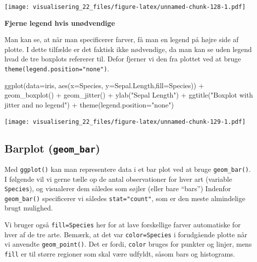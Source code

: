 \documentclass[
]{book}
\newenvironment{Shaded}{\begin{snugshade}}{\end{snugshade}}
\newcommand{\AttributeTok}[1]{\textcolor[rgb]{0.77,0.63,0.00}{#1}}
\newcommand{\FunctionTok}[1]{\textcolor[rgb]{0.00,0.00,0.00}{#1}}
\newcommand{\NormalTok}[1]{#1}
\newcommand{\SpecialCharTok}[1]{\textcolor[rgb]{0.00,0.00,0.00}{#1}}
\newcommand{\StringTok}[1]{\textcolor[rgb]{0.31,0.60,0.02}{#1}}
\begin{document}
\texttt{[image: visualisering\_22\_files/figure-latex/unnamed-chunk-128-1.pdf]}

\textbf{Fjerne legend hvis unødvendige}

Man kan se, at når man specificerer farver, få man en legend på højre side af plotte. I dette tilfælde er det faktisk ikke nødvendige, da man kan se uden legend hvad de tre boxplots refererer til. Defor fjerner vi den fra plottet ved at bruge \texttt{theme(legend.position="none")}.

\begin{Shaded}
\begin{Highlighting}[]
\FunctionTok{ggplot}\NormalTok{(}\AttributeTok{data=}\NormalTok{iris, }\FunctionTok{aes}\NormalTok{(}\AttributeTok{x=}\NormalTok{Species, }\AttributeTok{y=}\NormalTok{Sepal.Length,}\AttributeTok{fill=}\NormalTok{Species)) }\SpecialCharTok{+} 
  \FunctionTok{geom\_boxplot}\NormalTok{() }\SpecialCharTok{+} 
  \FunctionTok{geom\_jitter}\NormalTok{() }\SpecialCharTok{+}
  \FunctionTok{ylab}\NormalTok{(}\StringTok{"Sepal Length"}\NormalTok{) }\SpecialCharTok{+} 
  \FunctionTok{ggtitle}\NormalTok{(}\StringTok{"Boxplot with jitter and no legend"}\NormalTok{) }\SpecialCharTok{+}
  \FunctionTok{theme}\NormalTok{(}\AttributeTok{legend.position=}\StringTok{"none"}\NormalTok{)}
\end{Highlighting}
\end{Shaded}

\texttt{[image: visualisering\_22\_files/figure-latex/unnamed-chunk-129-1.pdf]}

\hypertarget{barplot-geom_bar}{%
\subsection{\texorpdfstring{Barplot (\texttt{geom\_bar})}{Barplot (geom\_bar)}}\label{barplot-geom_bar}}

Med \texttt{ggplot()} kan man representere data i et bar plot ved at bruge \texttt{geom\_bar()}. I følgende vil vi gerne tælle op de antal observationer for hver art (variable \texttt{Species}), og visualerer dem således som søjler (eller bare ``bars'') Indenfor \texttt{geom\_bar()} specificerer vi således \texttt{stat="count"}, som er den meste almindelige brugt mulighed.

Vi bruger også \texttt{fill=Species} her for at lave forskellige farver automatiske for hver af de tre arte. Bemærk, at det var \texttt{color=Species} i forudgående plotte når vi anvendte \texttt{geom\_point()}. Det er fordi, \texttt{color} bruges for punkter og linjer, mens \texttt{fill} er til større regioner som skal være udfyldt, såsom bars og histograms.
\end{document}
